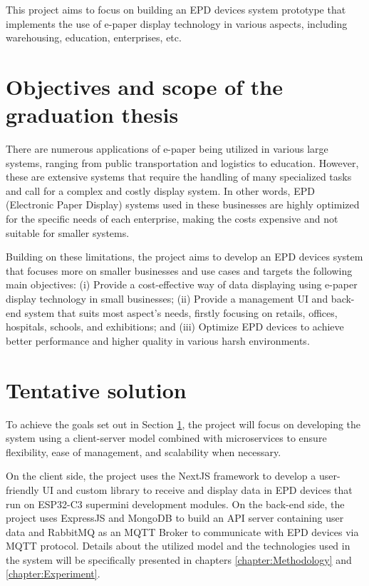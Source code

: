 \documentclass[../Main.tex]{subfiles}
\begin{document}
This project aims to focus on building an \gls{EPD} devices system prototype that implements the use of e-paper display technology in various aspects, including warehousing, education, enterprises, etc.

\section{Objectives and scope of the graduation thesis}
\label{section:1.2}
There are numerous applications of e-paper being utilized in various large systems, ranging from public transportation and logistics to education. However, these are extensive systems that require the handling of many specialized tasks and call for a complex and costly display system. In other words, \gls{EPD} (Electronic Paper Display) systems used in these businesses are highly optimized for the specific needs of each enterprise, making the costs expensive and not suitable for smaller systems.

Building on these limitations, the project aims to develop an \gls{EPD} devices system that focuses more on smaller businesses and use cases and targets the following main objectives: (i) Provide a cost-effective way of data displaying using e-paper display technology in small businesses; (ii) Provide a management UI and back-end system that suits most aspect's needs, firstly focusing on retails, offices, hospitals, schools, and exhibitions; and (iii) Optimize \gls{EPD} devices to achieve better performance and higher quality in various harsh environments.

\section{Tentative solution}
\label{section:1.3}
To achieve the goals set out in Section \ref{section:1.2}, the project will focus on developing the system using a client-server model combined with microservices to ensure flexibility, ease of management, and scalability when necessary. 

On the client side, the project uses the NextJS framework to develop a user-friendly UI and custom library to receive and display data in \gls{EPD} devices that run on ESP32-C3 supermini development modules. On the back-end side, the project uses ExpressJS and MongoDB to build an API server containing user data and RabbitMQ as an MQTT Broker to communicate with \gls{EPD} devices via MQTT protocol. Details about the utilized model and the technologies used in the system will be specifically presented in chapters \ref{chapter:Methodology} and \ref{chapter:Experiment}.
\end{document}
